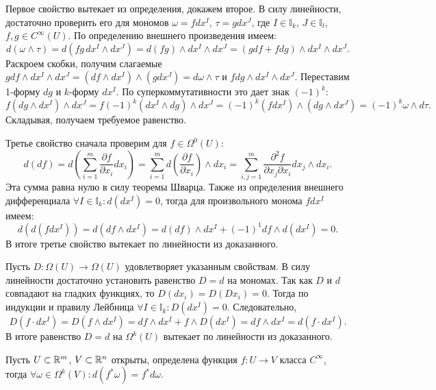 \begin{myproof}
	Первое свойство вытекает из определения, докажем второе. 
	В силу линейности, достаточно проверить его для мономов $\omega = f dx^I$, $\tau = g dx^J$, где $I \in \mathbb{I}_k$, $J \in \mathbb{I}_l$, $f, g \in C^{\infty}(U)$. 
	По определению внешнего произведения имеем: 
	\[ d(\omega \wedge \tau) = d(fg \, dx^I \wedge dx^J) = d(fg) \wedge dx^I \wedge dx^J = (g df + f dg) \wedge dx^I \wedge dx^J. \]
	Раскроем скобки, получим слагаемые $g df \wedge dx^I \wedge dx^J = (df \wedge dx^I) \wedge (g dx^J) = d\omega \wedge \tau$ и $f dg \wedge dx^I \wedge dx^J$.
	Переставим 1-форму $dg$ и $k$-форму $dx^I$. По суперкоммутативности это дает знак $(-1)^{k}$:
	\[ f (dg \wedge dx^I) \wedge dx^J = f (-1)^k (dx^I \wedge dg) \wedge dx^J = (-1)^k (f dx^I) \wedge (dg \wedge dx^J) = (-1)^k \omega \wedge d\tau. \]
	Складывая, получаем требуемое равенство. 

	\vspace{5pt}
	Третье свойство сначала проверим для $f \in \Omega^0(U)$:
	\[ d(df) = d\left( \sum_{i=1}^m \frac{\partial f}{\partial x_i} dx_i \right) = \sum_{i=1}^m d\left( \frac{\partial f}{\partial x_i} \right) \wedge dx_i = \sum_{i, j = 1}^m \frac{\partial^2 f}{\partial x_j \partial x_i} dx_j \wedge dx_i. \]
	Эта сумма равна нулю в силу теоремы Шварца. 
	Также из определения внешнего дифференциала $\forall I \in \mathbb{I}_k : d(dx^I) = 0$, тогда для произвольного монома $f dx^I$ имеем:
	\[ d( d(f dx^I) ) = d(df \wedge dx^I) = d(df) \wedge dx^I + (-1)^1 df \wedge d(dx^I) = 0. \]
	В итоге третье свойство вытекает по линейности из доказанного. 

	\vspace{5pt}
	Пусть $D : \Omega(U) \to \Omega(U)$ удовлетворяет указанным свойствам. 
	В силу линейности достаточно установить равенство $D = d$ на мономах. 
	Так как $D$ и $d$ совпадают на гладких функциях, то $D(dx_i) = D(Dx_i) = 0$. 
	Тогда по индукции и правилу Лейбница $\forall I \in \mathbb{I}_k : D(dx^I) = 0$. 
	Следовательно, 
	\[ D(f \cdot dx^I) = D(f \wedge dx^I) = df \wedge dx^I + f \wedge D(dx^I) = df \wedge dx^I = d(f \cdot dx^I). \]
	В итоге равенство $D = d$ на $\Omega^k(U)$ вытекает по линейности из доказанного.
\end{myproof}


\begin{theorem}
	Пусть $U \subset \mathbb{R}^m$, $V \subset \mathbb{R}^n$ открыты, определена функция $f : U \to V$ класса $C^{\infty}$, тогда $\forall \omega \in \Omega^k(V) : d(f^* \omega) = f^* d \omega$. 
\end{theorem}

